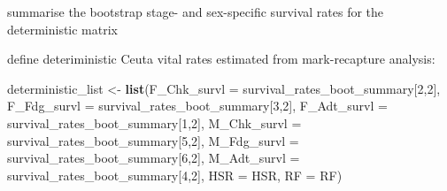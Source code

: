 \documentclass[]{article}
\newenvironment{Shaded}{\begin{snugshade}}{\end{snugshade}}
\newcommand{\KeywordTok}[1]{\textcolor[rgb]{0.13,0.29,0.53}{\textbf{{#1}}}}
\newcommand{\DataTypeTok}[1]{\textcolor[rgb]{0.13,0.29,0.53}{{#1}}}
\newcommand{\DecValTok}[1]{\textcolor[rgb]{0.00,0.00,0.81}{{#1}}}
\newcommand{\StringTok}[1]{\textcolor[rgb]{0.31,0.60,0.02}{{#1}}}
\newcommand{\OtherTok}[1]{\textcolor[rgb]{0.56,0.35,0.01}{{#1}}}
\newcommand{\NormalTok}[1]{{#1}}
\begin{document}
summarise the bootstrap stage- and sex-specific survival rates for the
deterministic matrix

\begin{Shaded}
\end{Shaded}

define deteriministic Ceuta vital rates estimated from mark-recapture
analysis:

\begin{Shaded}
\begin{Highlighting}[]
\NormalTok{deterministic_list <-}\StringTok{ }\KeywordTok{list}\NormalTok{(}\DataTypeTok{F_Chk_survl =} \NormalTok{survival_rates_boot_summary[}\DecValTok{2}\NormalTok{,}\DecValTok{2}\NormalTok{],}
                           \DataTypeTok{F_Fdg_survl =} \NormalTok{survival_rates_boot_summary[}\DecValTok{3}\NormalTok{,}\DecValTok{2}\NormalTok{],}
                           \DataTypeTok{F_Adt_survl =} \NormalTok{survival_rates_boot_summary[}\DecValTok{1}\NormalTok{,}\DecValTok{2}\NormalTok{],}
                           \DataTypeTok{M_Chk_survl =} \NormalTok{survival_rates_boot_summary[}\DecValTok{5}\NormalTok{,}\DecValTok{2}\NormalTok{],}
                           \DataTypeTok{M_Fdg_survl =} \NormalTok{survival_rates_boot_summary[}\DecValTok{6}\NormalTok{,}\DecValTok{2}\NormalTok{],}
                           \DataTypeTok{M_Adt_survl =} \NormalTok{survival_rates_boot_summary[}\DecValTok{4}\NormalTok{,}\DecValTok{2}\NormalTok{],}
                           \DataTypeTok{HSR =} \NormalTok{HSR,}
                           \DataTypeTok{RF =} \NormalTok{RF)}
\end{Highlighting}
\end{Shaded}
\end{document}
